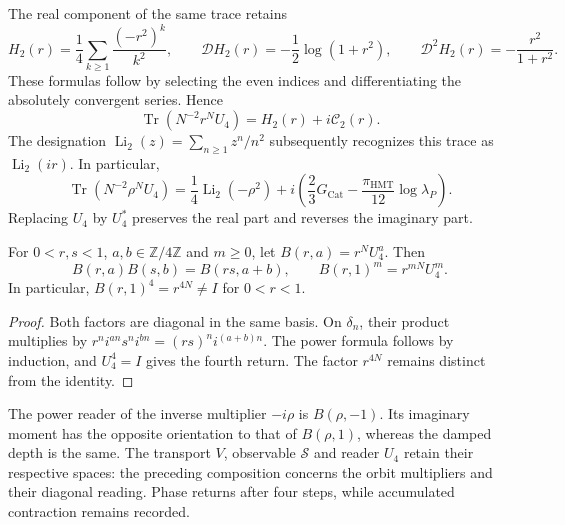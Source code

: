 The real component of the same trace retains
\[
 H_2(r)=\frac14\sum_{k\geq1}\frac{(-r^2)^k}{k^2},
 \qquad
 \mathcal D H_2(r)=-\frac12\log(1+r^2),\qquad
 \mathcal D^2H_2(r)=-\frac{r^2}{1+r^2}.
\]
These formulas follow by selecting the even indices and
differentiating the absolutely convergent series. Hence
\[
 \operatorname{Tr}(N^{-2}r^NU_4)=H_2(r)+i\mathcal C_2(r).
\]
The designation
\(\operatorname{Li}_2(z)=\sum_{n\geq1}z^n/n^2\)
subsequently recognizes this trace as
\(\operatorname{Li}_2(ir)\). In particular,
\[
 \operatorname{Tr}(N^{-2}\rho^NU_4)
 =\frac14\operatorname{Li}_2(-\rho^2)
  +i\left(\frac23G_{\mathrm{Cat}}
       -\frac{\pi_{\mathrm{HMT}}}{12}\log\lambda_P\right).
\]
Replacing \(U_4\) by \(U_4^*\) preserves the real
part and reverses the imaginary part.

\begin{proposition}
\label{corpus9:iv:pell-composicion}
For \(0<r,s<1\), \(a,b\in\mathbb Z/4\mathbb Z\) and \(m\geq0\), let
\(B(r,a)=r^NU_4^a\). Then
\[
 B(r,a)B(s,b)=B(rs,a+b),\qquad
 B(r,1)^m=r^{mN}U_4^m.
\]
In particular, \(B(r,1)^4=r^{4N}\ne I\) for \(0<r<1\).
\end{proposition}
\begin{proof}
Both factors are diagonal in the same basis. On
\(\delta_n\), their product multiplies by
\(r^ni^{an}s^ni^{bn}=(rs)^ni^{(a+b)n}\).
The power formula follows by induction, and
\(U_4^4=I\) gives the fourth return. The factor
\(r^{4N}\) remains distinct from the identity.
\end{proof}

The power reader of the inverse multiplier
\(-i\rho\) is \(B(\rho,-1)\). Its imaginary moment has
the opposite orientation to that of \(B(\rho,1)\), whereas
the damped depth is the same. The transport \(V\),
observable \(\mathscr S\) and reader \(U_4\) retain
their respective spaces: the preceding composition concerns
the orbit multipliers and their diagonal reading.
Phase returns after four steps, while accumulated
contraction remains recorded.
